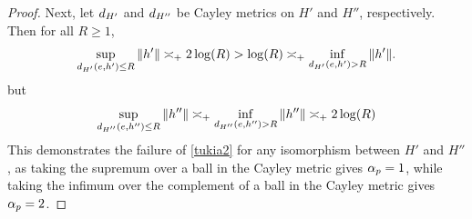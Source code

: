 {\begin{proof}
Next, let $d_{H'}$ and $d_{H''}$ be Cayley metrics on $H'$ and $H''$, respectively. Then for all $R\geq 1$,
\[
\sup_{d_{H'}(e,h') \leq R} \|h'\| \asymp_+ 2\log(R) > \log(R) \asymp_+ \inf_{d_{H'}(e,h') > R} \|h'\|.
\]
but
\[
\sup_{d_{H''}(e,h'') \leq R} \|h''\| \asymp_+ \inf_{d_{H''}(e,h'') > R} \|h''\| \asymp_+ 2\log(R)
\]
This demonstrates the failure of \eqref{tukia2} for any isomorphism between $H'$ and $H''$, as taking the supremum over a ball in the Cayley metric gives $\alpha_p = 1$, while taking the infimum over the complement of a ball in the Cayley metric gives $\alpha_p = 2$.
%
%
\end{proof}


%

%


}
